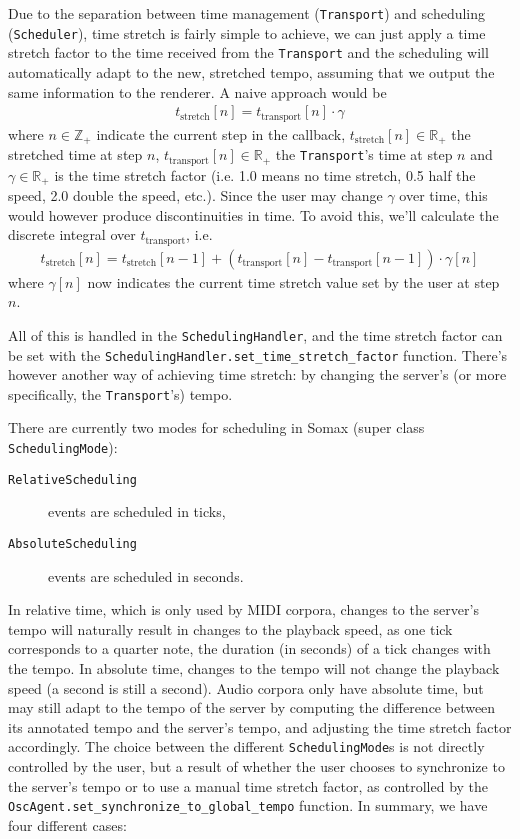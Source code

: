 Due to the separation between time management (\texttt{Transport}) and scheduling \\ (\texttt{Scheduler}), time stretch is fairly simple to achieve, we can just apply a time stretch factor to the time received from the \texttt{Transport} and the scheduling will automatically adapt to the new, stretched tempo, assuming that we output the same information to the renderer. A naive approach would be
\begin{align}
	t_\text{stretch}[n] = t_\text{transport}[n] \cdot \gamma
\end{align}
where $n \in \mathbb Z_+$ indicate the current step in the callback, $t_\text{stretch}[n] \in \mathbb R_+$ the stretched time at step $n$, $t_\text{transport}[n] \in \mathbb R_+$ the \texttt{Transport}'s time at step $n$ and $\gamma \in \mathbb R_+$ is the time stretch factor (i.e. 1.0 means no time stretch, 0.5 half the speed, 2.0 double the speed, etc.). Since the user may change $\gamma$ over time, this would however produce discontinuities in time. To avoid this, we'll calculate the discrete integral over $t_\text{transport}$, i.e.
\begin{align}\label{eq:2-timestretch}
	t_\text{stretch}[n] = 	t_\text{stretch}[n-1]  + \left(t_\text{transport}[n] - t_\text{transport}[n-1]\right)\cdot \gamma[n]
\end{align}
where $\gamma[n]$ now indicates the current time stretch value set by the user at step $n$. 

All of this is handled in the \texttt{SchedulingHandler}, and the time stretch factor can be set with the \texttt{SchedulingHandler.set\_time\_stretch\_factor} function. There's however another way of achieving time stretch: by changing the server's (or more specifically, the \texttt{Transport}'s) tempo.

There are currently two modes for scheduling in Somax (super class \texttt{SchedulingMode}): 
\begin{description}
	\item[\texttt{RelativeScheduling}] events are scheduled in ticks,
	\item[\texttt{AbsoluteScheduling}] events are scheduled in seconds. 
\end{description}
In relative time, which is only used by MIDI corpora, changes to the server's tempo will naturally result in changes to the playback speed, as one tick corresponds to a quarter note, the duration (in seconds) of a tick changes with the tempo. In absolute time, changes to the tempo will not change the playback speed (a second is still a second). Audio corpora only have absolute time, but may still adapt to the tempo of the server by computing the difference between its annotated tempo and the server's tempo, and adjusting the time stretch factor accordingly. The choice between the different \texttt{SchedulingMode}s is not directly controlled by the user, but a result of whether the user chooses to synchronize to the server's tempo or to use a manual time stretch factor, as controlled by the \texttt{OscAgent.set\_synchronize\_to\_global\_tempo} function. In summary, we have four different cases:

